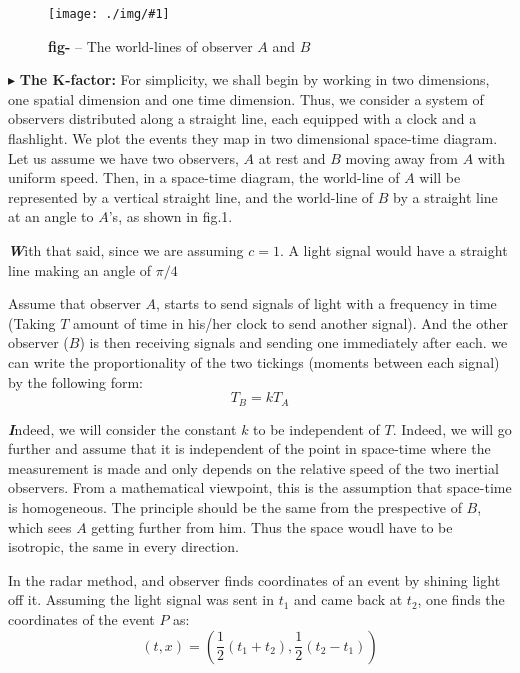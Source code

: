 \documentclass[10pt,a4paper,twocolumn]{article}
\newcommand{\rich}[1]{\textcolor{richblack}{#1}}
\newcounter{figurecounter}
\newcommand{\img}[3]{
    \begin{figure}[h!]
        \centering
        \captionsetup{justification=centering,margin=0cm,labelformat=empty}
        \texttt{[image: ./img/\#1]}
        \label{figure}
        \caption{\small\textbf{fig-\thefigurecounter} -- \textcolor{darkliver}{#3}}
    \end{figure}
    \addtocounter{figurecounter}{1}}
\newenvironment{callout}
	{\begin{calloutbox}\color{charcoal}\textbf\textit}
	{\end{calloutbox}}
\newcommand{\newpoint}[1]{\indent$\blacktriangleright$ \textbf{#1}}
\begin{document}
                \img{figoneworldline}{0.8}{The world-lines of observer $A$ and $B$}
                \newpoint{The K-factor: } For simplicity, we shall begin by working in two dimensions, one spatial dimension and one time dimension. Thus, we consider a system of observers distributed along a straight line, each equipped with a clock and a flashlight. We plot the events they map in two dimensional space-time diagram. Let us assume we have two observers, $A$ at rest and $B$ moving away from $A$ with uniform speed. Then, in a space-time diagram, the world-line of $A$ will be represented by a vertical straight line, and the world-line of $B$ by a straight line at an angle to $A$'s, as shown in fig.1.
                \begin{callout}
                    With that said, since we are assuming $c=1$. A light signal would have a straight line making an angle of $\pi/4$
                \end{callout}
                \indent Assume that observer $A$, starts to send signals of light with a frequency in time (Taking $T$ amount of time in his/her clock to send another signal). And the other observer ($B$) is then receiving signals and sending one immediately after each. we can write the proportionality of the two tickings (moments between each signal) by the following form:
                \begin{equation}
                    T_B = k T_A
                \end{equation}
                \begin{callout}
                    Indeed, we will consider the constant $k$ to be independent of $T$. Indeed, we will go further and assume that it is independent of the point in space-time where the measurement is made and only depends on the relative speed of the two inertial observers. From a mathematical viewpoint, this is the assumption that space-time is \rich{homogeneous}. The principle should be the same from the prespective of $B$, which sees $A$ getting further from him. Thus the space woudl have to be \rich{isotropic}, the same in every direction.
                \end{callout}
                In the radar method, and observer finds coordinates of an event by shining light off it. Assuming the light signal was sent in $t_1$ and came back at $t_2$, one finds the coordinates of the event $P$ as:
                \begin{equation}
                    (t,x) = (\frac12(t_1+t_2),\frac12(t_2-t_1))
                \end{equation}
\end{document}
